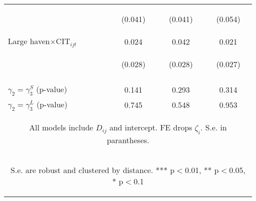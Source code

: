\documentclass[twoside,a4paper,11pt]{article}
\begin{document}
\begin{table}[t!]
{\begin{tabular}{lccc}
			\vspace{4pt} & \begin{footnotesize}(0.041)\end{footnotesize} & \begin{footnotesize}(0.041)\end{footnotesize} & \begin{footnotesize}(0.054)\end{footnotesize} \\
			Large haven$\times\text{CIT}_{ijt}$ & 0.024 & 0.042 & 0.021 \\
			& \begin{footnotesize}(0.028)\end{footnotesize} & \begin{footnotesize}(0.028)\end{footnotesize} & \begin{footnotesize}(0.027)\end{footnotesize} \\
			\vspace{4pt} & \begin{footnotesize}\end{footnotesize} & \begin{footnotesize}\end{footnotesize} & \begin{footnotesize}\end{footnotesize} \\
			$\gamma_2=\gamma^S_3$ (p-value) & 0.141 & 0.293 & 0.314 \\
			$\gamma_2=\gamma^L_3 $ (p-value) & 0.745 & 0.548 & 0.953 \\ \hline
			\multicolumn{4}{c}{\begin{footnotesize} All models include $ D_{ij}$ and intercept. FE drops $\zeta_i$. S.e. in parantheses.\end{footnotesize}} \\
			\multicolumn{4}{c}{\begin{footnotesize} S.e. are robust and clustered by distance. *** p$<$0.01, ** p$<$0.05, * p$<$0.1\end{footnotesize}} \\
		\end{tabular}
	}
\end{table}
\end{document}
